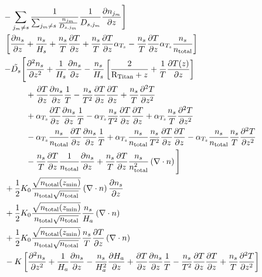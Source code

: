 \begin{equation}
\begin{split}
                  & - \sum_{j_m \neq s}\frac{1}{\sum_{j_m \neq s}\frac{n_{j_m}}{D_{s,j_m}}}
                                 \frac{1}{D_{s,j_m}}\frac{\partial n_{j_m}}{\partial z}\Bigg]\\
                  &\:
                                \left[\frac{\partial n_s}{\partial z} + \frac{n_s}{H_s} + 
                                \frac{n_s}{T}\frac{\partial T}{\partial z} + \frac{n_s}{T}\frac{\partial T}{\partial z}\alpha_{T_s} 
                                - \frac{n_s}{T}\frac{\partial T}{\partial z}\alpha_{T_s}\frac{n_s}{n_\text{total}}\right] \\
                  &\:\begin{split} 
                        - \tilde{D_s}\Bigg[
                             & \frac{\partial^2n_s}{\partial{z}^2} 
                                + \frac{1}{H_s}\frac{\partial n_s}{\partial z} 
                                - \frac{n_s}{H_s}\left[\frac{2}{\text{R}_\text{Titan} + z} + \frac{1}{T}\frac{\partial T(z)}{\partial z}\right]  \\  
                             &  + \frac{\partial T}{\partial z}\frac{\partial n_s}{\partial z}\frac{1}{T} 
                                - \frac{n_s}{T^2}\frac{\partial T}{\partial z}\frac{\partial T}{\partial z} 
                                + \frac{n_s}{T}\frac{\partial^2T}{\partial{z}^2}\\
                             &  + \alpha_{T_s}\frac{\partial T}{\partial z}\frac{\partial n_s}{\partial z}\frac{1}{T} 
                                - \alpha_{T_s}\frac{n_s}{T^2}\frac{\partial T}{\partial z}\frac{\partial T}{\partial z} 
                                + \alpha_{T_s}\frac{n_s}{T}\frac{\partial^2T}{\partial{z}^2} \\
                             &  - \alpha_{T_s}\frac{n_s}{n_\text{total}}\frac{\partial T}{\partial z}\frac{\partial n_s}{\partial z}\frac{1}{T} 
                                + \alpha_{T_s}\frac{n_s}{n_\text{total}}\frac{n_s}{T^2}\frac{\partial T}{\partial z}\frac{\partial T}{\partial z} 
                                - \alpha_{T_s}\frac{n_s}{n_\text{total}}\frac{n_s}{T}\frac{\partial^2T}{\partial{z}^2} \\
                             &  - \frac{n_s}{T}\frac{\partial T}{\partial z}\frac{1}{n_\text{total}}\frac{\partial n_s}{\partial z} 
                                + \frac{n_s}{T}\frac{\partial T}{\partial z}\frac{n_s}{n_\text{total}^2}\left(\nabla\cdot{\ensuremath{n}}\right)
                        \Bigg] 
                      \end{split} \\
                  &\: + \frac{1}{2} K_0  \frac{\sqrt{n_\text{total}(z_\text{min})}}{n_\text{total}\sqrt{n_\text{total}}}\left(\nabla\cdot{\ensuremath{n}}\right)
                         \frac{\partial n_s}{\partial z} \\
                  &\: + \frac{1}{2} K_0  \frac{\sqrt{n_\text{total}(z_\text{min})}}{n_\text{total}\sqrt{n_\text{total}}}
                        \frac{n_s}{H_a}\left(\nabla\cdot{\ensuremath{n}}\right) \\
                  &\: + \frac{1}{2} K_0  \frac{\sqrt{n_\text{total}(z_\text{min})}}{n_\text{total}\sqrt{n_\text{total}}}
                        \frac{n_s}{T}\frac{\partial T}{\partial z}\left(\nabla\cdot{\ensuremath{n}}\right) \\
                  &\: - K \left[\frac{\partial^2n_s}{\partial{z}^2} + \frac{1}{H_a}\frac{\partial n_s}{\partial z} - \frac{n_s}{H_a^2}\frac{\partial H_a}{\partial z} 
                        + \frac{\partial T}{\partial z}\frac{\partial n_s}{\partial z}\frac{1}{T} - \frac{n_s}{T^2}\frac{\partial T}{\partial z}\frac{\partial T}{\partial z} + \frac{n_s}{T}\frac{\partial^2T}{\partial{z}^2}
\right]
\end{split}
\end{equation}
